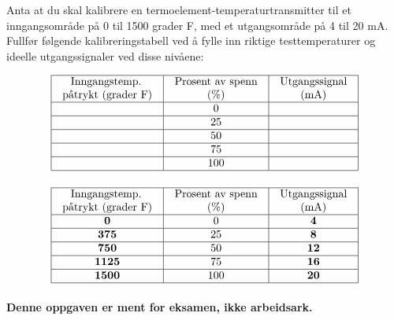 

Anta at du skal kalibrere en termoelement-temperaturtransmitter til et inngangsområde på 0 til 1500 grader F, med et utgangsområde på 4 til 20 mA. Fullfør følgende kalibreringstabell ved å fylle inn riktige testtemperaturer og ideelle utgangssignaler ved disse nivåene:


$$\vbox{\offinterlineskip
\halign{\strut
\vrule \quad\hfil # \ \hfil &
\vrule \quad\hfil # \ \hfil &
\vrule \quad\hfil # \ \hfil \vrule \cr
\noalign{\hrule}
%
Inngangstemp. & Prosent av spenn & Utgangssignal \cr
%
påtrykt (grader F) & (\%) & (mA) \cr
%
\noalign{\hrule}
%
 & 0 &  \cr
%
\noalign{\hrule}
%
 & 25 &  \cr
%
\noalign{\hrule}
%
 & 50 &  \cr
%
\noalign{\hrule}
%
 & 75 &  \cr
%
\noalign{\hrule}
%
 & 100 &  \cr
%
\noalign{\hrule}
} %
}$$ %








$$\vbox{\offinterlineskip
\halign{\strut
\vrule \quad\hfil # \ \hfil &
\vrule \quad\hfil # \ \hfil &
\vrule \quad\hfil # \ \hfil \vrule \cr
\noalign{\hrule}
%
Inngangstemp. & Prosent av spenn & Utgangssignal \cr
%
påtrykt (grader F) & (\%) & (mA) \cr
%
\noalign{\hrule}
%
{\bf 0} & 0 & {\bf 4} \cr
%
\noalign{\hrule}
%
{\bf 375} & 25 & {\bf 8} \cr
%
\noalign{\hrule}
%
{\bf 750} & 50 & {\bf 12} \cr
%
\noalign{\hrule}
%
{\bf 1125} & 75 & {\bf 16} \cr
%
\noalign{\hrule}
%
{\bf 1500} & 100 & {\bf 20} \cr
%
\noalign{\hrule}
} %
}$$ %







{\bf Denne oppgaven er ment for eksamen, ikke arbeidsark.}

